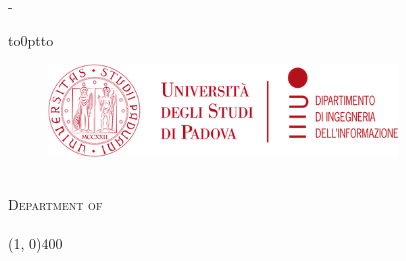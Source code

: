 \begin{titlingpage}
	\thispagestyle{empty}

	\calccentering\unitlength %

	\begin{adjustwidth}{\unitlength}{-\unitlength}
		\begin{center}
			\vbox to0pt{\vbox to\vss}
			\begin{figure}
				\centering
				\includegraphics[height=2.45cm]{themes/unipd-dei/static/unipd-dei.png}%
			\end{figure}

			{\scshape \Large{\bfseries{\UnivName}}} \\
			{\scshape \large{Department of \DeptName}} \\
			\vspace{3pt}
			{\scshape \large{\textit{\DegreeName}}} \\
			\line(1, 0){400} \\


\end{center}
\end{adjustwidth}
\end{titlingpage}
